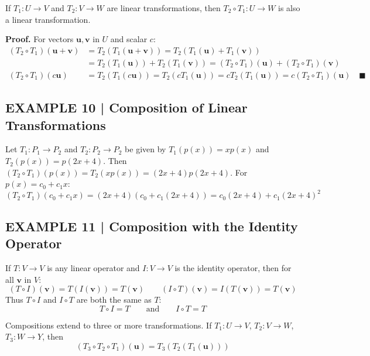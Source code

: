 \documentclass{article}
\begin{document}
\begin{tcolorbox}[colback=red!4, colframe=red!60!black,
  title={\textbf{Theorem 8.2.5}}, boxrule=0.5mm, arc=3mm]
If $T_1 : U \to V$ and $T_2 : V \to W$ are linear transformations, then $T_2 \circ T_1 : U \to W$
is also a linear transformation.
\end{tcolorbox}

\textbf{Proof.} For vectors $\mathbf{u},\mathbf{v}$ in $U$ and scalar $c$:
\begin{align*}
  (T_2\circ T_1)(\mathbf{u}+\mathbf{v})
    &= T_2(T_1(\mathbf{u}+\mathbf{v})) = T_2(T_1(\mathbf{u})+T_1(\mathbf{v}))\\
    &= T_2(T_1(\mathbf{u}))+T_2(T_1(\mathbf{v}))
     = (T_2\circ T_1)(\mathbf{u}) + (T_2\circ T_1)(\mathbf{v})\\[2pt]
  (T_2\circ T_1)(c\mathbf{u})
    &= T_2(T_1(c\mathbf{u})) = T_2(cT_1(\mathbf{u})) = cT_2(T_1(\mathbf{u}))
     = c(T_2\circ T_1)(\mathbf{u}) \quad\blacksquare
\end{align*}

\subsection*{EXAMPLE 10 | Composition of Linear Transformations}

Let $T_1 : P_1 \to P_2$ and $T_2 : P_2 \to P_2$ be given by
$T_1(p(x)) = xp(x)$ and $T_2(p(x)) = p(2x+4)$.
Then $(T_2 \circ T_1)(p(x)) = T_2(xp(x)) = (2x+4)p(2x+4)$.
For $p(x) = c_0 + c_1 x$:
\[
  (T_2\circ T_1)(c_0+c_1x) = (2x+4)(c_0+c_1(2x+4)) = c_0(2x+4)+c_1(2x+4)^2
\]

\subsection*{EXAMPLE 11 | Composition with the Identity Operator}

If $T : V \to V$ is any linear operator and $I : V \to V$ is the identity operator, then
for all $\mathbf{v}$ in $V$:
\[
  (T \circ I)(\mathbf{v}) = T(I(\mathbf{v})) = T(\mathbf{v})
  \qquad
  (I \circ T)(\mathbf{v}) = I(T(\mathbf{v})) = T(\mathbf{v})
\]
Thus $T \circ I$ and $I \circ T$ are both the same as $T$:
\begin{equation}
  T \circ I = T \qquad \text{and} \qquad I \circ T = T \tag{5}
\end{equation}

Compositions extend to three or more transformations. If $T_1 : U\to V$, $T_2 : V\to W$,
$T_3 : W \to Y$, then
\begin{equation}
  (T_3 \circ T_2 \circ T_1)(\mathbf{u}) = T_3(T_2(T_1(\mathbf{u}))) \tag{6}
\end{equation}
\end{document}
